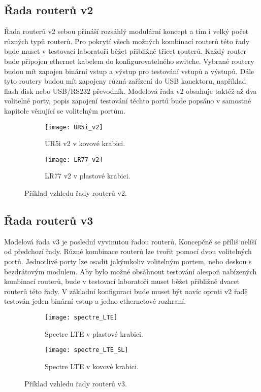 \subsection{Řada routerů v2}
Řada routerů v2 sebou přináší rozsáhlý modulární koncept a tím i velký počet různých typů routerů. Pro pokrytí všech možných kombinací routerů této řady bude muset v testovací laboratoři běžet přibližně třicet routerů. Každý router bude připojen ethernet kabelem do konfigurovatelného switche. Vybrané routery budou mít zapojen binární vstup a výstup pro testování vstupů a výstupů. Dále tyto routery budou mít zapojeny různá zařízení do USB konektoru, například flash disk nebo USB/RS232 převodník. Modelová řada v2 obsahuje taktéž až dva volitelné porty, popis zapojení testování těchto portů bude popsáno v samostné kapitole věnující se volitelným portům.

\begin{figure}[h]
  \begin{subfigure}[h]{0.5\LW}
    \centering
    \texttt{[image: UR5i\_v2]}
    \caption{UR5i v2 v kovové krabici.}
    \label{fig:UR5i_v2}
  \end{subfigure}
  \begin{subfigure}[h]{0.5\LW}
    \centering
    \texttt{[image: LR77\_v2]}
    \caption{LR77 v2 v plastové krabici.}
    \label{fig:LR77_v2}
  \end{subfigure}
  \caption{Příklad vzhledu řady routerů v2.}
  \label{fig:UR5i_v2}
\end{figure}

\subsection{Řada routerů v3}
Modelová řada v3 je poslední vyvinutou řadou routerů. Koncepčně se příliš nelíší od předchozí řady. Různé kombinace routerů lze tvořit pomocí dvou volitelných portů. Jednotlivé porty lze osadit jakýmkoliv volitelným portem, nebo deskou s bezdrátovým modulem. Aby bylo možné obsáhnout testování alespoň nabízených kombinací routerů, bude v testovací laboratoři muset běžet přibližně dvacet routerů této řady. V základní konfiguraci bude muset být navíc oproti v2 řadě testován jeden binární vstup a jedno ethernetové rozhraní.

\begin{figure}[h]
  \begin{subfigure}[h]{0.5\LW}
    \centering
    \texttt{[image: spectre\_LTE]}
    \caption{Spectre LTE v plastové krabici.}
    \label{fig:spectre_LTE}
  \end{subfigure}
  \begin{subfigure}[h]{0.5\LW}
    \centering
    \texttt{[image: spectre\_LTE\_SL]}
    \caption{Spectre LTE v kovové krabici.}
    \label{fig:spectre_LTE_SL}
  \end{subfigure}
  \caption{Příklad vzhledu řady routerů v3.}
  \label{fig:spectre_LTE}
\end{figure}

